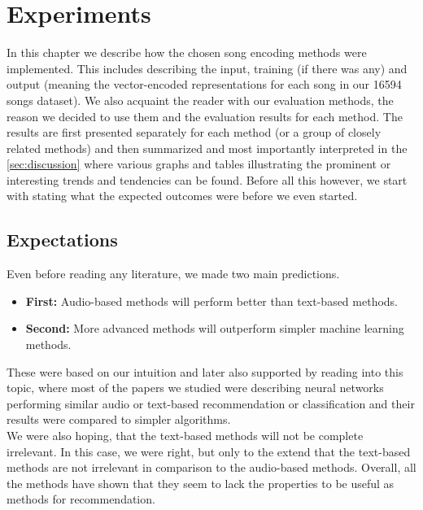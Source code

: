 \chapter{Experiments}\label{chap:experiments}

In this chapter we describe how the chosen song encoding methods were implemented. This includes describing the input, training (if there was any) and output (meaning the vector-encoded representations for each song in our 16594 songs dataset). We also acquaint the reader with our evaluation methods, the reason we decided to use them and the evaluation results for each method. The results are first presented separately for each method (or a group of closely related methods) and then summarized and most importantly interpreted in the \ref{sec:discussion} where various graphs and tables illustrating the prominent or interesting trends and tendencies can be found. Before all this however, we start with stating what the expected outcomes were before we even started.

\section{Expectations}

Even before reading any literature, we made two main predictions. 
\begin{itemize}
    \item \textbf{First:} Audio-based methods will perform better than text-based methods.
    \item \textbf{Second:} More advanced methods will outperform simpler machine learning methods.
\end{itemize}
These were based on our intuition and later also supported by reading into this topic, where most of the papers we studied were describing neural networks performing similar audio or text-based recommendation or classification and their results were compared to simpler algorithms. \\
We were also hoping, that the text-based methods will not be complete irrelevant. In this case, we were right, but only to the extend that the text-based methods are not irrelevant in comparison to the audio-based methods. Overall, all the methods have shown that they seem to lack the properties to be useful as methods for recommendation.

